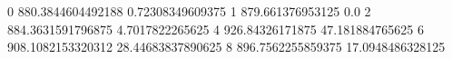 0 880.3844604492188 0.72308349609375
1 879.661376953125 0.0
2 884.3631591796875 4.7017822265625
4 926.84326171875 47.181884765625
6 908.1082153320312 28.44683837890625
8 896.7562255859375 17.0948486328125
